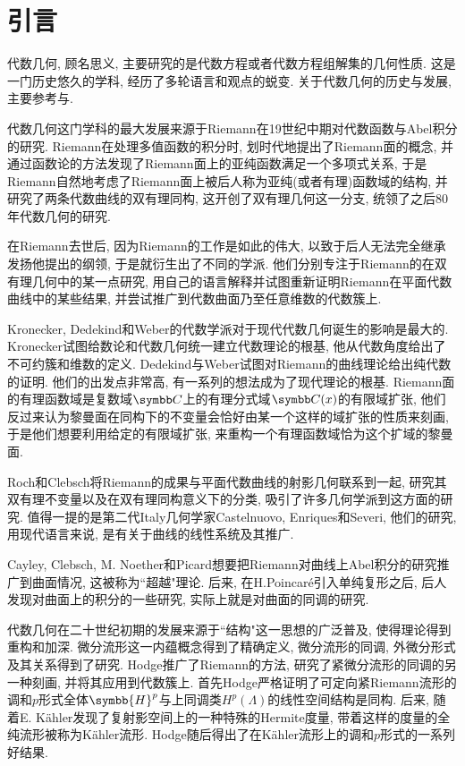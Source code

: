 
\section{引言}

代数几何, 顾名思义, 主要研究的是代数方程或者代数方程组解集的几何性质. 这是一门历史悠久的学科, 经历了多轮语言和观点的蜕变. 关于代数几何的历史与发展, 主要参考\parencite[18--113, V-VIII]{sally_history_1985}与\parencite[xiii, Introduction]{hartshorne_algebraic_1977}.

代数几何这门学科的最大发展来源于Riemann在19世纪中期对代数函数与Abel积分的研究. Riemann在处理多值函数的积分时, 划时代地提出了Riemann面的概念, 并通过函数论的方法发现了Riemann面上的亚纯函数满足一个多项式关系, 于是Riemann自然地考虑了Riemann面上被后人称为亚纯(或者有理)函数域的结构, 并研究了两条代数曲线的双有理同构, 这开创了双有理几何这一分支, 统领了之后80年代数几何的研究.

在Riemann去世后, 因为Riemann的工作是如此的伟大, 以致于后人无法完全继承发扬他提出的纲领, 于是就衍生出了不同的学派. 他们分别专注于Riemann的在双有理几何中的某一点研究, 用自己的语言解释并试图重新证明Riemann在平面代数曲线中的某些结果, 并尝试推广到代数曲面乃至任意维数的代数簇上.

Kronecker, Dedekind和Weber的代数学派对于现代代数几何诞生的影响是最大的. Kronecker试图给数论和代数几何统一建立代数理论的根基, 他从代数角度给出了不可约簇和维数的定义. Dedekind与Weber试图对Riemann的曲线理论给出纯代数的证明. 他们的出发点非常高, 有一系列的想法成为了现代理论的根基. Riemann面的有理函数域是复数域$\CC$上的有理分式域$\CC(x)$的有限域扩张, 他们反过来认为黎曼面在同构下的不变量会恰好由某一个这样的域扩张的性质来刻画, 于是他们想要利用给定的有限域扩张, 来重构一个有理函数域恰为这个扩域的黎曼面.

Roch和Clebsch将Riemann的成果与平面代数曲线的射影几何联系到一起, 研究其双有理不变量以及在双有理同构意义下的分类, 吸引了许多几何学派到这方面的研究. 值得一提的是第二代Italy几何学家Castelnuovo, Enriques和Severi, 他们的研究, 用现代语言来说, 是有关于曲线的线性系统及其推广.

Cayley, Clebsch, M. Noether和Picard想要把Riemann对曲线上Abel积分的研究推广到曲面情况, 这被称为``超越"理论. 后来, 在H.Poincar\'e引入单纯复形之后, 后人发现对曲面上的积分的一些研究, 实际上就是对曲面的同调的研究.

代数几何在二十世纪初期的发展来源于``结构"这一思想的广泛普及, 使得理论得到重构和加深. 微分流形这一内蕴概念得到了精确定义, 微分流形的同调, 外微分形式及其关系得到了研究. Hodge推广了Riemann的方法, 研究了紧微分流形的同调的另一种刻画, 并将其应用到代数簇上. 首先Hodge严格证明了可定向紧Riemann流形的调和$p$形式全体$\symbb{H}^p$与上同调类$H^p(\Lambda)$的线性空间结构是同构. 后来, 随着E. K\"ahler发现了复射影空间上的一种特殊的Hermite度量, 带着这样的度量的全纯流形被称为K\"ahler流形. Hodge随后得出了在K\"ahler流形上的调和$p$形式的一系列好结果.

